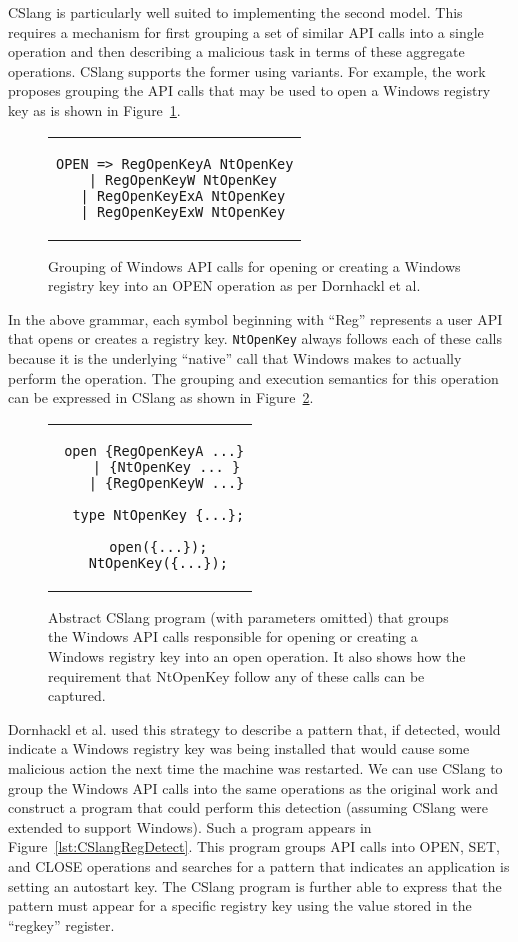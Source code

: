 CSlang is particularly well suited to implementing the second model.  This
requires a mechanism for first grouping a set of similar API calls
into a single operation and then describing a malicious task in terms of
these aggregate operations.  CSlang supports the former using variants.
For example, the work proposes grouping the API calls that may be used to
open a Windows registry key as is shown in Figure~\ref{lst:DornhacklOpen}.

\begin{figure}[H]
\centering
\begin{tabular}{c}
\begin{lstlisting}
OPEN => RegOpenKeyA NtOpenKey
  | RegOpenKeyW NtOpenKey
  | RegOpenKeyExA NtOpenKey
  | RegOpenKeyExW NtOpenKey
\end{lstlisting}
\end{tabular}
\caption{Grouping of Windows API calls for opening or creating a Windows
  registry key into an OPEN operation as per Dornhackl et al.}
\label{lst:DornhacklOpen}
\end{figure}


In the above grammar, each symbol beginning with ``Reg'' represents a user
API that opens or creates a registry key.  {\tt NtOpenKey} always follows
each of these calls because it is the underlying ``native'' call that
Windows makes to actually perform the operation.
The grouping and execution semantics for this operation can be expressed
in CSlang as shown in Figure~\ref{lst:CSlangOpenReg}.


\begin{figure}[H]
\centering
\begin{tabular}{c}
\begin{lstlisting}
 open {RegOpenKeyA ...}
    | {NtOpenKey ... }
    | {RegOpenKeyW ...}

  type NtOpenKey {...};

  open({...});
  NtOpenKey({...});
\end{lstlisting}
\end{tabular}
  \caption{Abstract CSlang program (with parameters
  omitted) that groups the Windows API calls responsible for opening or
  creating a Windows registry key into an open operation.  It also shows
  how the requirement that NtOpenKey follow any of these calls can be
  captured.}
\label{lst:CSlangOpenReg}
\end{figure}

Dornhackl et al. used this strategy to describe a pattern that, if
detected, would indicate
a Windows registry key was being installed
that would cause some malicious action
the next time the machine was restarted.  We can use CSlang to group the
Windows API calls into the same operations as the original work and
construct a program that could perform this detection (assuming CSlang were
extended to support Windows).  Such a program appears in
Figure~\ref{lst:CSlangRegDetect}.  This program groups API calls into OPEN,
SET, and CLOSE operations and searches for a pattern that
indicates
an application is
setting an autostart key.  The CSlang program is further able to express
that the pattern must appear for a specific registry key using the value
stored in the ``regkey'' register.


